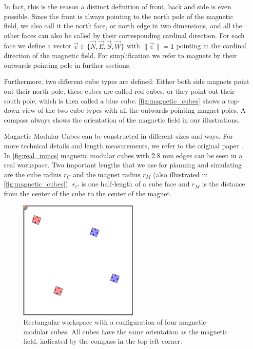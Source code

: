 In fact, this is the reason a distinct definition of front, back and side is even possible.
Since the front is always pointing to the north pole of the magnetic field, we also call it the north face, or north edge in two dimensions, and all the other faces can also be called by their corresponding cardinal direction.
For each face we define a vector $\vec{e} \in \{ \vec{N},\vec{E},\vec{S},\vec{W}\}$ with $\lVert \vec{e} \rVert = 1$ pointing in the cardinal direction of the magnetic field.
For simplification we refer to magnets by their outwards pointing pole in further sections.

Furthermore, two different cube types are defined:
Either both side magnets point out their north pole, these cubes are called red cubes, or they point out their south pole, which is then called a blue cube.
\autoref{fig:magnetic_cubes} shows a top-down view of the two cube types with all the outwards pointing magnet poles.
A compass always shows the orientation of the magnetic field in our illustrations.

Magnetic Modular Cubes can be constructed in different sizes and ways. For more technical details and length measurements, we refer to the original paper \cite{Bhattacharjee2022}.
In \autoref{fig:real_mmcs} magnetic modular cubes with 2.8 mm edges can be seen in a real workspace.
Two important lengths that we use for planning and simulating are the cube radius $r_C$ and the magnet radius $r_M$ (also illustrated in \autoref{fig:magnetic_cubes}).
$r_C$ is one half-length of a cube face and $r_M$ is the distance from the center of the cube to the center of the magnet.

\begin{figure}
	\centering
	\includegraphics[width=0.53\textwidth]{figures/workspace_config.png}
	\caption[Workspace with a configuration of four magnetic modular cubes]{Rectangular workspace with a configuration of four magnetic modular cubes. All cubes have the same orientation as the magnetic field, indicated by the compass in the top-left corner.}
	\label{fig:workspace_config}
\end{figure}

